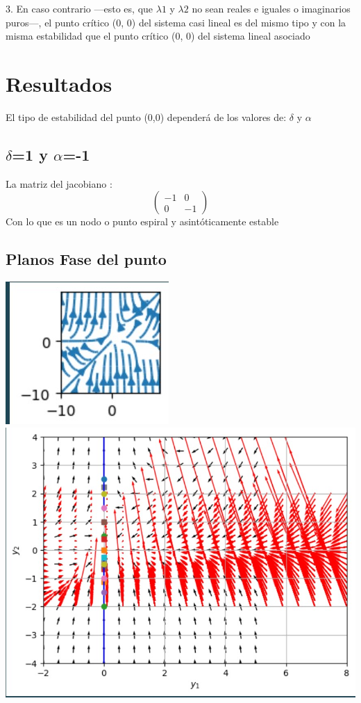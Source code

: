 \documentclass{article}
\begin{document}
      3. En caso contrario —esto es, que  $\lambda1$ y  $\lambda2$ no sean reales e iguales o imaginarios 
      puros—, el punto crítico (0, 0) del sistema casi lineal  es del mismo 
      tipo y con la misma estabilidad que el punto crítico (0, 0) del sistema lineal 
      asociado

    \section{Resultados}
       El tipo de estabilidad del punto (0,0) dependerá de los valores de: $\delta$ y $\alpha$
       \subsection{$\delta$=1 y $\alpha$=-1} 
         La matriz del jacobiano $:$
         \[
          \left(
          \begin{array}{lc}
            -1 & 0\\
            0 & -1
          \end{array}
          \right)
          \]         
          Con lo que es un nodo o punto espiral y asintóticamente estable 
          \subsection*{Planos Fase del punto }
          \noindent
          \includegraphics{Isoclinas de a=-1 y d=1.jpg}
           \includegraphics{Campo Vectoraal para a=-1 y d=1.jpg}\\
           
\end{document}
